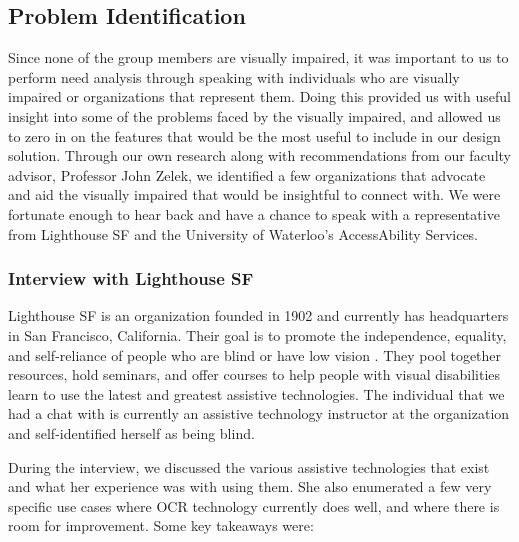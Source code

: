 \documentclass[a4paper,11pt]{article}
\begin{document}
\subsection{Problem Identification}
Since none of the group members are visually impaired, it was important to us to perform need analysis through speaking with individuals who are visually impaired or organizations that represent them. Doing this provided us with useful insight into some of the problems faced by the visually impaired, and allowed us to zero in on the features that would be the most useful to include in our design solution. Through our own research along with recommendations from our faculty advisor, Professor John Zelek, we identified a few organizations that advocate and aid the visually impaired that would be insightful to connect with. We were fortunate enough to hear back and have a chance to speak with a representative from Lighthouse SF and the University of Waterloo's AccessAbility Services.

\subsubsection{Interview with Lighthouse SF}
Lighthouse SF is an organization founded in 1902 and currently has headquarters in San Francisco, California. Their goal is to promote the independence, equality, and self-reliance of people who are blind or have low vision \cite{lighthouse-sf-homepage}. They pool together resources, hold seminars, and offer courses to help people with visual disabilities learn to use the latest and greatest assistive technologies. The individual that we had a chat with is currently an assistive technology instructor at the organization and self-identified herself as being blind.

During the interview, we discussed the various assistive technologies that exist and what her experience was with using them. She also enumerated a few very specific use cases where OCR technology currently does well, and where there is room for improvement. Some key takeaways were:
\end{document}
